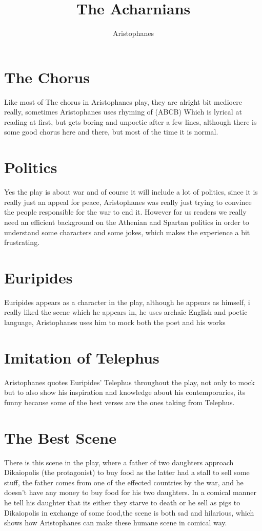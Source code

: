 \documentclass[12pt, a4paper]{article}
\title{The Acharnians}
\author{Aristophanes}
\date{}
\begin{document}
\maketitle

\section*{The Chorus}
{\fontpar
Like most of The chorus in Aristophanes play, they are alright
bit mediocre really, sometimes Aristophanes uses rhyming of (ABCB)
Which is lyrical at reading at first, but gets boring and 
unpoetic after a few lines, although there is some good chorus here
and there, but most of the time it is normal.
}

\section*{Politics}

{\fontpar
Yes the play is about war and of course it will include a lot of 
politics, since it is really just an appeal for peace, Aristophanes 
was really just trying to convince the people responsible for the 
war to end it. However for us readers we really need an efficient
background on the Athenian and Spartan politics in order to
understand some characters and some jokes, which makes the 
experience a bit frustrating.
}

\section*{Euripides}

{\fontpar
Euripides appears as a character in the play, although he appears
as himself, i really liked the scene which he appears in, he uses 
archaic English and poetic language, Aristophanes uses him to
mock both the poet and his works
}

\section*{Imitation of Telephus}

{\fontpar
Aristophanes quotes Euripides' Telephus throughout the play,
not only to mock but to also show his inspiration and knowledge 
about his contemporaries, its funny because some of the 
best verses are the ones taking from Telephus.
}

\section*{The Best Scene}

{\fontpar
There is this scene in the play, where a father of two daughters
approach Dikaiopolis (the protagonist) to buy food as the latter had a stall
to sell some stuff, the father comes from one of the effected 
countries by the war, and he doesn't have any money to buy food 
for his two daughters. In a comical manner he tell his daughter 
that its either they starve to death or he sell as pigs to 
Dikaiopolis in exchange of some food,the scene is both sad and
hilarious, which shows how Aristophanes can make these humane scene 
in comical way. 
}
\end{document}
